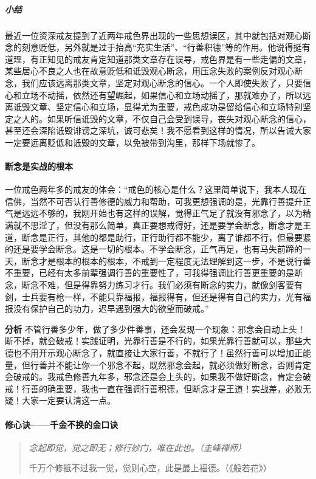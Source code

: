 \subparagraph*{小结}

最近一位资深戒友提到了近两年戒色界出现的一些思想误区，其中就包括对观心断念的刻意贬低，另外就是过于抬高“充实生活”、“行善积德”等的作用。他说得挺有道理，有正知见的戒友肯定知道那类文章存在误导，戒色界是有一些走偏的文章，某些居心不良之人也在故意贬低和诋毁观心断念，用压念失败的案例反对观心断念，我们应该远离那类文章，坚定对观心断念的信心。一个人即使失败了，只要信心和立场不动摇，依然还有望崛起，如果信心和立场动摇了，那就难办了，所以远离诋毁文章、坚定信心和立场，显得尤为重要，戒色成功是留给信心和立场特别坚定之人的。如果听信诋毁的文章，不仅自己会受到误导，丧失对观心断念的信心，甚至还会深陷诋毁诽谤之深坑，诚可悲矣！我不愿看到这样的情况，所以告诫大家一定要远离贬低和诋毁的文章，以免被带到沟里，那样下场就惨了。

\paragraph{断念是实战的根本}

一位戒色两年多的戒友的体会：“戒色的核心是什么？这里简单说下，我本人现在信佛，当然不可否认行善修德的威力和帮助，可我更想强调的是，光靠行善提升正气是远远不够的，我刚开始也有这样的误解，觉得正气足了就没有邪念了，以为精满就不思淫了，但没有那么简单，真正要想戒得好，还是要学会断念，断念才是王道，断念是正行，其他的都是助行，正行助行都不能少，离了谁都不行，但最要紧的还是要学会断念。这是一切的根本。不学会断念，正气再足，也有马失前蹄的一天，断念才是根本的根本的根本，不戒到一定程度无法理解到这一步，不是说行善不重要，已经有太多前辈强调行善的重要性了，可我得强调比行善更重要的是断念，断念不难，但是得靠努力练习才行。我们必须有断念的实力，就像剑客要有剑，士兵要有枪一样，不能只靠福报，福报得有，但还是得有自己的实力，光有福报没有保护自己的功力，迟早遇到强大的欲望而破戒。”

\textbf{分析} 不管行善多少年，做了多少件善事，还会发现一个现象：邪念会自动上头！断不掉，就会破戒！实践证明，光靠行善是不行的，如果光靠行善就可以，那些大德也不用开示观心断念了，就直接让大家行善，不就行了！虽然行善可以增加正能量，但行善并不能让你一个邪念不起，既然邪念会起，就必须做好断念，否则肯定会破戒的。我戒色修善九年多，邪念还是会上头的，如果我不做好断念，肯定会破戒！行善的确重要，我也一直在强调行善积德，但断念才是王道！实战差，必败无疑！大家一定要认清这一点。

\paragraph{修心诀——千金不换的金口诀}

\begin{quotation}\it
    念起即觉，觉之即无；修行妙门，唯在此也。（圭峰禅师）

    千万个修抵不过我一觉，觉则心空，此是最上福德。（《般若花》）
\end{quotation}

